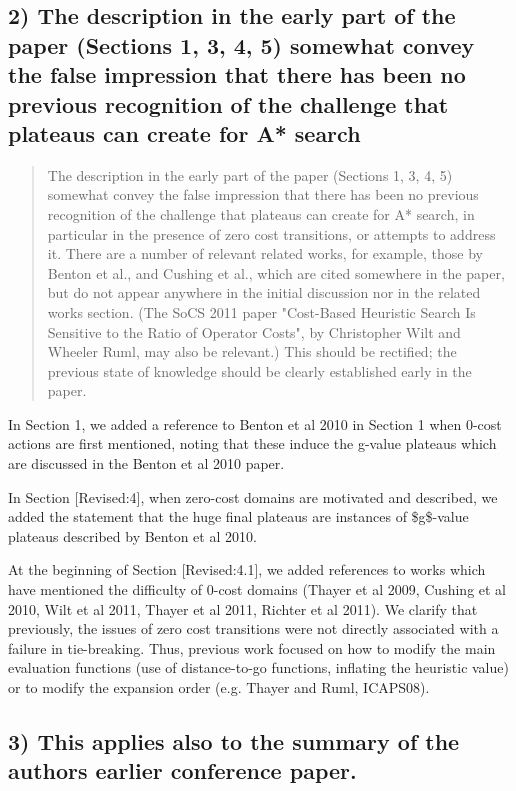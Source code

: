 \documentclass{article}
\begin{document}
\subsection{2) The description in the early part of the paper (Sections 1, 3, 4, 5) somewhat convey the false impression that there has been no previous recognition of the challenge that plateaus can create for A* search}
\label{sec:orgheadline27}

\begin{quote}
 The description in the early part of the paper (Sections 1, 3, 4, 5)
somewhat convey the false impression that there has been no previous
recognition of the challenge that plateaus can create for A* search,
in particular in the presence of zero cost transitions, or attempts to
address it. There are a number of relevant related works, for example,
those by Benton et al., and Cushing et al., which are cited somewhere
in the paper, but do not appear anywhere in the initial discussion nor
in the related works section. (The SoCS 2011 paper "Cost-Based
Heuristic Search Is Sensitive to the Ratio of Operator Costs", by
Christopher Wilt and Wheeler Ruml, may also be relevant.) This should
be rectified; the previous state of knowledge should be clearly
established early in the paper.
\end{quote}

In Section 1, we added a reference to Benton et al 2010 in Section 1 when 0-cost
actions are first mentioned, noting that these induce the g-value
plateaus which are discussed in the Benton et al 2010 paper.

In Section [Revised:4], when zero-cost domains are motivated and described, 
we added the statement that the huge final plateaus are instances of \$g\$-value plateaus described by Benton et al 2010.

At the beginning of Section [Revised:4.1], we added references to
works which have mentioned the difficulty of 0-cost domains (Thayer et
al 2009, Cushing et al 2010, Wilt et al 2011, Thayer et al 2011,
Richter et al 2011).
We clarify that previously, the issues of zero cost transitions were not directly associated with 
a failure in tie-breaking. Thus, previous work focused on how to modify the main 
evaluation functions (use of distance-to-go functions, inflating the heuristic value)
or to modify the expansion order (e.g. Thayer and Ruml, ICAPS08).

\subsection{3) This applies also to the summary of the authors earlier conference paper.}
\label{sec:orgheadline28}
\end{document}
